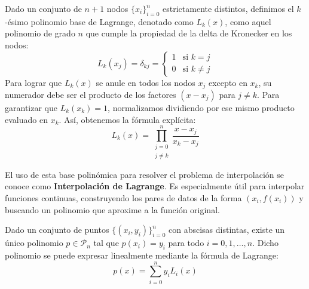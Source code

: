 \begin{definición}
    Dado un conjunto de $n+1$ nodos $\{ x_i \}_{i=0}^n$ estrictamente distintos, definimos el $k$-ésimo polinomio base de Lagrange, denotado como $L_k(x)$, como aquel polinomio de grado $n$ que cumple la propiedad de la delta de Kronecker en los nodos:
    \[
        L_k(x_j) = \delta_{kj} = 
        \begin{cases}
            1 & \text{si } k = j \\
            0 & \text{si } k \neq j
        \end{cases}
    \]
    Para lograr que $L_k(x)$ se anule en todos los nodos $x_j$ excepto en $x_k$, su numerador debe ser el producto de los factores $(x - x_j)$ para $j \neq k$. Para garantizar que $L_k(x_k) = 1$, normalizamos dividiendo por ese mismo producto evaluado en $x_k$. Así, obtenemos la fórmula explícita:
    \[
        L_k(x) = \prod_{\substack{j=0 \\ j \neq k}}^n \frac{x - x_j}{x_k - x_j}
    \]
\end{definición}

El uso de esta base polinómica para resolver el problema de interpolación se conoce como \textbf{Interpolación de Lagrange}. Es especialmente útil para interpolar funciones continuas, construyendo los pares de datos de la forma $(x_i, f(x_i))$ y buscando un polinomio que aproxime a la función original.

\begin{teorema}
    Dado un conjunto de puntos $\{ (x_i, y_i) \}_{i=0}^n$ con abscisas distintas, existe un único polinomio $p \in \mathcal{P}_n$ tal que $p(x_i) = y_i$ para todo $i = 0, 1, \ldots, n$. Dicho polinomio se puede expresar linealmente mediante la fórmula de Lagrange:
    \[
        p(x) = \sum_{i=0}^n y_i L_i(x)
    \]
\end{teorema}

